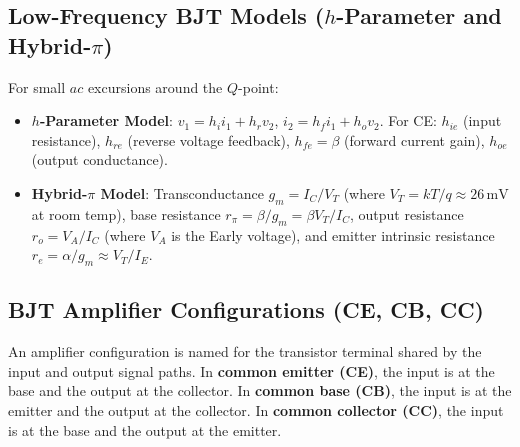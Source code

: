 \documentclass[12pt,a4paper]{article}
\begin{document}
\subsection{Low-Frequency BJT Models \texorpdfstring{($h$-Parameter and Hybrid-$\pi$)}{(h-Parameter and Hybrid-pi)}}
For small $ac$ excursions around the $Q$-point:
\begin{itemize}[leftmargin=1.5em, itemsep=2pt]
  \item \textbf{$h$-Parameter Model}: $v_1 = h_i i_1 + h_r v_2$, $i_2 = h_f i_1 + h_o v_2$. For CE: $h_{ie}$ (input resistance), $h_{re}$ (reverse voltage feedback), $h_{fe} = \beta$ (forward current gain), $h_{oe}$ (output conductance).
  \item \textbf{Hybrid-$\pi$ Model}: Transconductance $g_m = I_C/V_T$ (where $V_T = k T/q \approx 26\,\mathrm{mV}$ at room temp), base resistance $r_\pi = \beta/g_m = \beta V_T/I_C$, output resistance $r_o = V_A/I_C$ (where $V_A$ is the Early voltage), and emitter intrinsic resistance $r_e = \alpha/g_m \approx V_T/I_E$.
\end{itemize}

\subsection{BJT Amplifier Configurations (CE, CB, CC)}
\begin{tcolorbox}[defbox, title={Common-Terminal BJT Configurations}]
An amplifier configuration is named for the transistor terminal shared by the input and output signal paths. In \textbf{common emitter (CE)}, the input is at the base and the output at the collector. In \textbf{common base (CB)}, the input is at the emitter and the output at the collector. In \textbf{common collector (CC)}, the input is at the base and the output at the emitter.
\end{tcolorbox}
\end{document}
